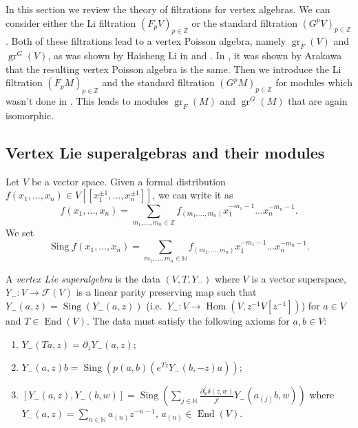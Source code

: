 \documentclass[a4paper, 12pt, reqno]{amsart}
\theoremstyle{remark}
\numberwithin{equation}{subsection}
\DeclareMathOperator{\gr}{gr}
\DeclareMathOperator{\End}{End}
\DeclareMathOperator{\Hom}{Hom}
\DeclareMathOperator{\Sing}{Sing}
\begin{document}
In this section we review the theory of filtrations for vertex algebras.
We can consider either the Li filtration $(F_pV)_{p \in \mathbb{Z}}$ or the standard filtration $(G^pV)_{p \in \mathbb{Z}}$.
Both of these filtrations lead to a vertex Poisson algebra, namely $\gr_F(V)$ and $\gr^G(V)$, as was shown by Haisheng Li in \cite{li_abelianizing_2005} and \cite{li_vertex_2004}.
In \cite{arakawa_remark_2012}, it was shown by Arakawa that the resulting vertex Poisson algebra is the same.
Then we introduce the Li filtration $(F_pM)_{p \in \mathbb{Z}}$ and the standard filtration $(G^pM)_{p \in \mathbb{Z}}$ for modules which wasn't done in \cite{li_vertex_2004}.
This leads to modules $\gr_F(M)$ and $\gr^G(M)$ that are again isomorphic.

\subsection{Vertex Lie superalgebras and their modules}
\label{sec:vert-lie-supera}

Let $V$ be a vector space.
Given a formal distribution $f(x_1, \dots, x_n) \in V[[x_1^{\pm 1}, \dots, x_n^{\pm 1}]]$, we can write it as
\begin{equation*}
  f(x_1, \dots, x_n) = \sum_{m_1, \dots, m_n \in \mathbb{Z}}f_{(m_1, \dots, m_n)}x_1^{-m_1 - 1}\dots x_n^{-m_n - 1}.
\end{equation*}
We set
\begin{equation*}
  \Sing f(x_1, \dots, x_n) = \sum_{m_1, \dots, m_n \in \mathbb{N}}f_{(m_1, \dots, m_n)}x_1^{-m_1 - 1}\dots x_n^{-m_n - 1}.
\end{equation*}

A \emph{vertex Lie superalgebra} is the data $(V, T, Y_-)$ where $V$ is a vector superspace, $Y_-: V \to \mathcal{F}(V)$ is a linear parity preserving map such that $Y_-(a, z) = \Sing(Y_-(a, z))$ (i.e.\ $Y_-: V \to \Hom(V, z^{-1}V[z^{-1}])$) for $a \in V$ and $T \in \End(V)$.
The data must satisfy the following axioms for $a, b \in V$:
\begin{enumerate}
\item $Y_-(Ta, z) = \partial_zY_-(a, z)$;
\item $Y_-(a, z)b = \Sing(p(a, b)(e^{Tz}Y_-(b, -z)a))$;
\item $[Y_-(a, z), Y_-(b, w)] = \Sing(\sum_{j \in \mathbb{N}}\frac{\partial^j_w\delta(z, w)}{j!}Y_-(a_{(j)}b, w))$ where $Y_-(a, z) = \sum_{n \in \mathbb{N}}a_{(n)}z^{-n - 1}$, $a_{(n)} \in \End(V)$.
\end{enumerate}
\end{document}
